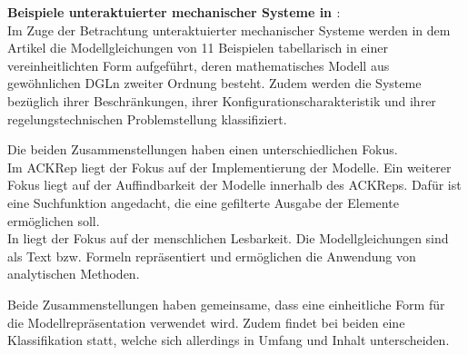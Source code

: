 \textbf{Beispiele unteraktuierter mechanischer Systeme in \cite{LIYU13}}:\\
Im Zuge der Betrachtung unteraktuierter mechanischer Systeme werden in dem Artikel die Modellgleichungen von 11 Beispielen tabellarisch in einer vereinheitlichten Form aufgeführt, deren mathematisches Modell aus gewöhnlichen DGLn zweiter Ordnung besteht. Zudem werden die Systeme bezüglich ihrer Beschränkungen, ihrer Konfigurationscharakteristik und ihrer regelungstechnischen Problemstellung klassifiziert.

Die beiden Zusammenstellungen haben einen unterschiedlichen Fokus.\\
Im ACKRep liegt der Fokus auf der Implementierung der Modelle. Ein weiterer Fokus liegt auf der Auffindbarkeit der Modelle innerhalb des ACKReps. Dafür ist eine Suchfunktion angedacht, die eine gefilterte Ausgabe der Elemente ermöglichen soll.\\
In \cite{LIYU13} liegt der Fokus auf der menschlichen Lesbarkeit. Die Modellgleichungen sind als Text bzw. Formeln repräsentiert und ermöglichen die Anwendung von analytischen Methoden. 

Beide Zusammenstellungen haben gemeinsame, dass eine einheitliche Form für die Modellrepräsentation verwendet wird. Zudem findet bei beiden eine Klassifikation statt, welche sich allerdings in Umfang und Inhalt unterscheiden.
